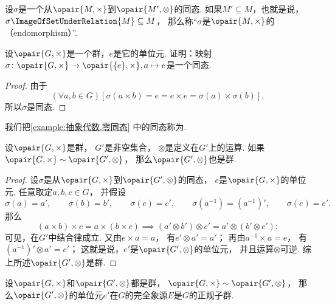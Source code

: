 \begin{definition}
设\(\sigma\)是一个从\(\opair{M,\times}\)到\(\opair{M',\otimes}\)的同态.
如果\(M' \subseteq M\)，也就是说，\(\sigma\ImageOfSetUnderRelation{M}\subseteq M\)，
那么称“\(\sigma\)是\(\opair{M,\times}\)的（endomorphism）”.
\end{definition}

\begin{example}\label{example:抽象代数.零同态}
设\(\opair{G,\times}\)是一个群，\(e\)是它的单位元.
证明：映射\(\sigma\colon\opair{G,\times}\to\opair{\{e\},\times},a\mapsto e\)是一个同态.
\begin{proof}
由于\[
	(\forall a,b\in G)[
		\sigma(a \times b)
		= e
		= e \times e
		= \sigma(a) \times \sigma(b)
	],
\]
所以\(\sigma\)是同态.
\end{proof}
\end{example}
我们把\cref{example:抽象代数.零同态} 中的同态称为.

\begin{theorem}\label{theorem:抽象代数.群的同态象是群}
设\(\opair{G,\times}\)是群，
\(G'\)是非空集合，
\(\otimes\)是定义在\(G'\)上的运算.
如果\(\opair{G,\times}\sim\opair{G',\otimes}\)，
那么\(\opair{G',\otimes}\)也是群.
\begin{proof}
设\(\sigma\)是从\(\opair{G,\times}\)到\(\opair{G',\otimes}\)的同态，
\(e\)是\(\opair{G,\times}\)的单位元.
任意取定\(a,b,c\in G\)，
并假设\[
	\sigma(a)=a', \qquad
	\sigma(b)=b', \qquad
	\sigma(c)=c', \qquad
	\sigma(a^{-1})=(a^{-1})', \qquad
	\sigma(e)=e'.
\]
那么\[
	(a \times b)\times c = a \times(b \times c)
	\implies
	(a' \otimes b')\otimes c' = a' \otimes(b' \otimes c');
\]
可见，在\(G'\)中结合律成立.
又由\(e\times a=a\)，
有\(e'\otimes a'=a'\)；
再由\(a^{-1}\times a=e\)，
有\((a^{-1})'\otimes a'=e'\)；
这就是说，\(e'\)是\(\opair{G',\otimes}\)的单位元，
并且运算\(\otimes\)可逆.
综上所述\(\opair{G',\otimes}\)是群.
\end{proof}
\end{theorem}

\begin{theorem}
设\(\opair{G,\times}\)和\(\opair{G',\otimes}\)都是群，
\(\opair{G,\times}\sim\opair{G',\otimes}\)，
那么\(\opair{G',\otimes}\)的单位元\(e'\)在\(G\)的完全象源\(E\)是\(G\)的正规子群.
\end{theorem}
